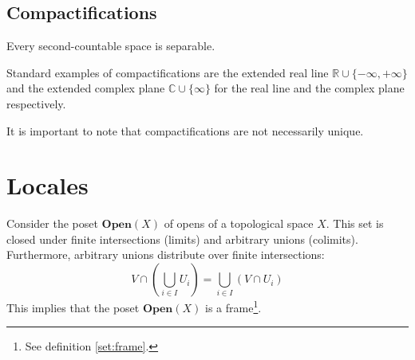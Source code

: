\subsection{Compactifications}

	\begin{property}
		Every second-countable space is separable.
	\end{property}
    
    
	\begin{example}
		Standard examples of compactifications are the extended real line $\mathbb{R} \cup \{-\infty, +\infty\}$ and the extended complex plane $\mathbb{C}\cup\{\infty\}$ for the real line and the complex plane respectively.
	\end{example}
	\begin{remark*}
		It is important to note that compactifications are not necessarily unique.
	\end{remark*}
    
    
\section{Locales}

	\begin{property}
		Consider the poset $\textbf{Open}(X)$ of opens of a topological space $X$. This set is closed under finite intersections (limits) and arbitrary unions (colimits). Furthermore, arbitrary unions distribute over finite intersections:
		\begin{equation}
			V\cap\left(\bigcup_{i\in I}U_i\right) = \bigcup_{i\in I}\left(V\cap U_i\right)
		\end{equation}
		This implies that the poset $\textbf{Open}(X)$ is a frame\footnote{See definition \ref{set:frame}.}.
	\end{property}
	
